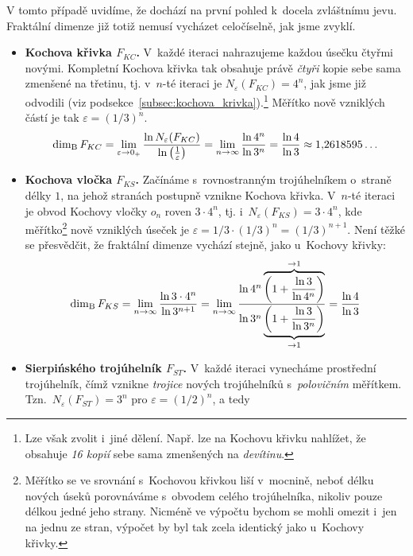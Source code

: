 V tomto případě uvidíme, že dochází na první pohled k~docela zvláštnímu jevu. Fraktální dimenze již totiž nemusí vycházet celočíselně, jak jsme zvyklí.
\begin{itemize}
    \item \textbf{Kochova křivka $F_{KC}$.} V~každé iteraci nahrazujeme každou úsečku čtyřmi novými. Kompletní Kochova křivka tak obsahuje právě \emph{čtyři} kopie sebe sama zmenšené na třetinu, tj. v~$n$-té iteraci je $N_\varepsilon(F_{KC})=4^n$, jak jsme již odvodili (viz podsekce~\ref{subsec:kochova_krivka}).\footnote{Lze však zvolit i~jiné dělení. Např. lze na Kochovu křivku nahlížet, že obsahuje \emph{16 kopií} sebe sama zmenšených na \emph{devítinu}.} Měřítko nově vzniklých částí je tak $\varepsilon=(1/3)^n$.
    \begin{equation}\label{eq:kochova-krivka-dimenze}
        \operatorname{dim_B}{F_{KC}}=\lim_{\varepsilon\to 0_+}{\dfrac{\ln{N_\varepsilon(F_{KC})}}{\ln{\left(\frac{1}{\varepsilon}\right)}}}=\lim_{n\to\infty}{\dfrac{\ln{4^n}}{\ln{3^n}}}=\dfrac{\ln{4}}{\ln{3}}\approx 1{,}2618595\dots
    \end{equation}
    \item \textbf{Kochova vločka $F_{KS}$.} Začínáme s~rovnostranným trojúhelníkem o~straně délky $1$, na jehož stranách postupně vznikne Kochova křivka. V~$n$-té iteraci je obvod Kochovy vločky $o_n$ roven $3\cdot 4^n$, tj. i~$N_\varepsilon(F_{KS})=3\cdot 4^n$, kde měřítko\footnote{Měřítko se ve srovnání s~Kochovou křivkou liší v~mocnině, neboť délku nových úseků porovnáváme s~obvodem celého trojúhelníka, nikoliv pouze délkou jedné jeho strany. Nicméně ve výpočtu bychom se mohli omezit i~jen na jednu ze stran, výpočet by byl tak zcela identický jako u~Kochovy křivky.} nově vzniklých úseček je $\varepsilon=1/3\cdot(1/3)^n=(1/3)^{n+1}$. Není těžké se přesvědčit, že fraktální dimenze vychází stejně, jako u~Kochovy křivky:
    \begin{equation}\label{eq:kochova-vlocka-dimenze}
        \operatorname{dim_B}{F_{KS}}=\lim_{n\to\infty}{\dfrac{\ln{3\cdot 4^n}}{\ln{3^{n+1}}}}=\lim_{n\to\infty}{\dfrac{\ln{4^n}\overbrace{\left(1+\frac{\ln{3}}{\ln{4^n}}\right)}^{\to 1}}{\ln{3^n}\underbrace{\left(1+\frac{\ln{3}}{\ln{3^n}}\right)}_{\to 1}}}=\dfrac{\ln{4}}{\ln{3}}
    \end{equation}
    \item \textbf{Sierpińského trojúhelník $F_{ST}$.} V~každé iteraci vynecháme prostřední trojúhelník, čímž vznikne \emph{trojice} nových trojúhelníků s~\emph{polovičním} měřítkem. Tzn.~$N_\varepsilon(F_{ST})=3^n$ pro $\varepsilon=(1/2)^n$, a tedy

\end{itemize}
